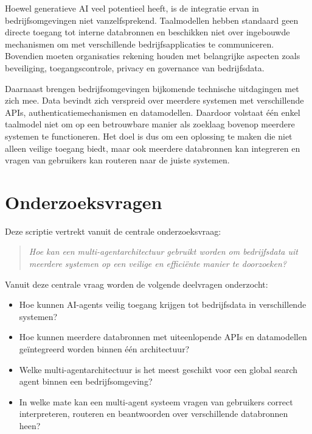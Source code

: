 Hoewel generatieve \gls{AI} veel potentieel heeft, is de integratie ervan in bedrijfsomgevingen niet vanzelfsprekend. Taalmodellen hebben standaard geen directe toegang tot interne databronnen en beschikken niet over ingebouwde mechanismen om met verschillende bedrijfsapplicaties te communiceren. Bovendien moeten organisaties rekening houden met belangrijke aspecten zoals beveiliging, toegangscontrole, privacy en governance van bedrijfsdata.

Daarnaast brengen bedrijfsomgevingen bijkomende technische uitdagingen met zich mee. Data bevindt zich verspreid over meerdere systemen met verschillende \glspl{API}, authenticatiemechanismen en datamodellen. Daardoor volstaat één enkel taalmodel niet om op een betrouwbare manier als zoeklaag bovenop meerdere systemen te functioneren. Het doel is dus om een oplossing te maken die niet alleen veilige toegang biedt, maar ook meerdere databronnen kan integreren en vragen van gebruikers kan routeren naar de juiste systemen.

\section{Onderzoeksvragen}
\label{sec:onderzoeksvragen}

Deze scriptie vertrekt vanuit de centrale onderzoeksvraag:

\begin{quote}
\textit{Hoe kan een multi-agentarchitectuur gebruikt worden om bedrijfsdata uit meerdere systemen op een veilige en efficiënte manier te doorzoeken?}
\end{quote}

Vanuit deze centrale vraag worden de volgende deelvragen onderzocht:

\begin{itemize}
    \item Hoe kunnen \gls{AI}-agents veilig toegang krijgen tot bedrijfsdata in verschillende systemen?
    \item Hoe kunnen meerdere databronnen met uiteenlopende \glspl{API} en datamodellen geïntegreerd worden binnen één architectuur?
    \item Welke multi-agentarchitectuur is het meest geschikt voor een global search agent binnen een bedrijfsomgeving?
    \item In welke mate kan een multi-agent systeem vragen van gebruikers correct interpreteren, routeren en beantwoorden over verschillende databronnen heen?
\end{itemize}

